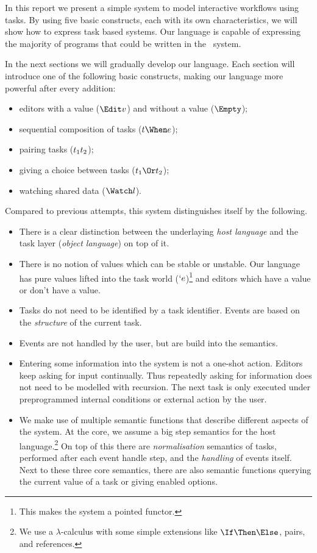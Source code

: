 
In this report we present a simple system to model interactive workflows using tasks.
By using five basic constructs,
each with its own characteristics,
we will show how to express task based systems.
Our language is capable of expressing the majority of programs that could be written in the \ITASKS\ system.

In the next sections we will gradually develop our language.
Each section will introduce one of the following basic constructs,
making our language more powerful after every addition:
\begin{itemize}
  \item editors with a value ($\Edit v$) and without a value ($\Empty$);
  \item sequential composition of tasks ($t \When e$);
  \item pairing tasks ($t_1 \relax t_2$);
  \item giving a choice between tasks ($t_1 \Or t_2$);
  \item watching shared data ($\Watch l$).
\end{itemize}

Compared to previous attempts,
this system distinguishes itself by the following.
\begin{itemize}
  \item
    There is a clear distinction between the underlaying \emph{host language} and the task layer (\emph{object language}) on top of it.
  \item
    There is no notion of values which can be stable or unstable.
    Our language has pure values lifted into the task world ($`e$)\footnote{
      This makes the system a pointed functor.}
    and editors which have a value or don't have a value.
  \item
    Tasks do not need to be identified by a task identifier.
    Events are based on the \emph{structure} of the current task.
  \item
    Events are not handled by the user, but are build into the semantics.
  \item
    Entering some information into the system is not a one-shot action.
    Editors keep asking for input continually.
    Thus repeatedly asking for information does not need to be modelled with recursion.
    The next task is only executed under preprogrammed internal conditions or external action by the user.
  \item
    We make use of multiple semantic functions that describe different aspects of the system.
    At the core, we assume a big step semantics for the host language.\footnote{
      We use a $\lambda$-calculus with some simple extensions like $\If\Then\Else$, pairs, and references.}
    On top of this there are \emph{normalisation} semantics of tasks,
    performed after each event handle step,
    and the \emph{handling} of events itself.
    Next to these three core semantics,
    there are also semantic functions querying the current value of a task
    or giving enabled options.
\end{itemize}

